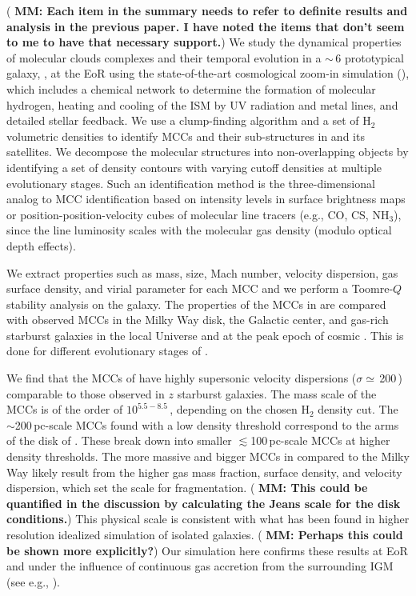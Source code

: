 \IfFileExists{emulateapjlegacy.cls}{\documentclass[iop]{emulateapjlegacy}}{\documentclass[iop]{emulateapj}}
\newcommand{\MM}[1]{({\bf \color{mmcolor} MM: #1})}
\begin{document}
\MM{Each item in the summary needs to refer to definite results and
  analysis in the previous paper.  I have noted the items that don't
  seem to me to have that necessary support.}
We study the dynamical properties of molecular clouds complexes and their temporal evolution in a \z$\sim$\,6 prototypical galaxy, \flower,
at the EoR using the state-of-the-art cosmological zoom-in simulation (),
which includes a chemical network to determine the formation of molecular
hydrogen, heating and cooling of the ISM by
    UV radiation and metal lines, 
and detailed stellar feedback.
We use a clump-finding algorithm and a set of H$_2$ volumetric densities
to identify MCCs and their sub-structures in \flower and its satellites.
We decompose the molecular structures into non-overlapping 
     objects
by identifying a set of 
     density contours with varying cutoff densities at multiple
evolutionary stages.
Such an identification method is 
     the three-dimensional analog
to MCC identification based on 
    intensity levels in surface brightness maps or
    position-position-velocity cubes
of molecular line tracers (e.g., CO, CS, NH$_3$),
since the line luminosity scales with the molecular gas density (modulo optical depth effects).

We extract properties such as mass, size, Mach number, velocity
dispersion, gas surface density, and virial parameter for each MCC and
we perform a Toomre-$Q$ stability analysis on the galaxy. 
The properties of the MCCs in \flower are compared with observed MCCs in the Milky Way disk, the Galactic center, and gas-rich starburst galaxies in the local Universe and at the peak epoch of cosmic \SF. This is done for different evolutionary stages of \flower.

We find that the MCCs of \flower 
have highly supersonic
velocity dispersions ($\sigma\simeq$\,200\,\kms) comparable to
those observed in $z$ starburst galaxies.
The mass scale of the MCCs is of the order of $10^{5.5-8.5}$\,\Msun,
depending on the chosen H$_{2}$ density cut. 
The $\sim$200\,pc-scale MCCs found with a low density threshold
correspond to the arms of the disk of \flower. These break down into smaller $\lesssim$100\,pc-scale MCCs at higher density thresholds.
The more massive and bigger MCCs in \flower compared to the Milky Way
likely result from the higher gas mass fraction, surface density, and velocity dispersion,
which set the scale for fragmentation. \MM{This could be quantified in
  the discussion by calculating the Jeans scale for the disk conditions.}
This physical scale is
consistent with what has been found in higher resolution idealized
simulation of isolated galaxies. \MM{Perhaps this could be shown more explicitly?}
Our simulation here confirms these results at EoR and under
the influence of continuous gas accretion from the surrounding IGM (see e.g., \citealt{Klessen10a, Goldbaum11a}).
\end{document}
